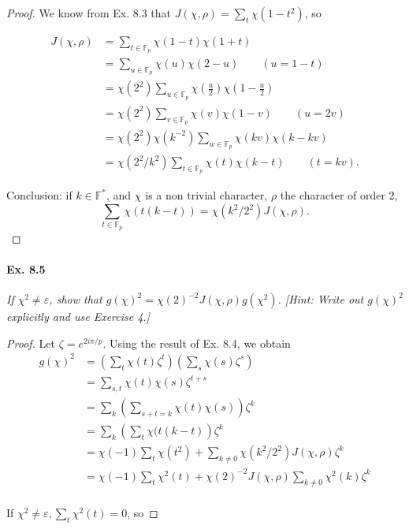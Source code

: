 \documentclass[11pt,a4paper]{article}
\newcommand{\F}{\mathbb{F}}
\begin{document}
{{}

\begin{proof}
We know from Ex. 8.3 that  $J(\chi,\rho) = \sum_t \chi(1-t^2)$, so

\begin{align*}
J(\chi,\rho) &= \sum_{t \in \F_p}\chi(1-t)\chi(1+t)\\
&=\sum_{u \in \F_p} \chi(u) \chi(2-u)\qquad(u = 1-t)\\
&=\chi(2^2) \sum_{u \in \F_p} \chi\left(\frac{u}{2}\right) \chi\left(1-\frac{u}{2}\right)\\
&= \chi(2^2) \sum_{v \in \F_p} \chi(v) \chi(1-v)\qquad(u = 2v)\\
&= \chi(2^2) \chi(k^{-2}) \sum_{w \in \F_p} \chi(kv) \chi(k-kv)\\
&=\chi(2^2/k^2) \sum_{t \in \F_p} \chi(t) \chi(k-t)\qquad(t=kv).
\end{align*}

Conclusion: if $k \in \mathbb{F}^*$, and $\chi$ is a non trivial character, $\rho$ the character of order 2,
$$ \sum_{t\in \F_p}\chi(t(k-t)) = \chi(k^2/2^2) J(\chi,\rho).$$
\end{proof}

\paragraph{Ex. 8.5}

{\it If $\chi^2 \ne \varepsilon$, show that $g(\chi)^2 = \chi(2)^{-2}J(\chi,\rho)g(\chi^2)$. [Hint: Write out $g(\chi)^2$ explicitly and use Exercise 4.]

}

\begin{proof}
Let  $\zeta = e^{2i\pi/p}$.
Using the result of Ex. 8.4, we obtain
\begin{align*}
g(\chi)^2 &= \left(\sum_t \chi(t) \zeta^t \right)\left(\sum_s \chi(s) \zeta^s\right)\\
&=\sum_{s,t} \chi(t)\chi(s) \zeta^{t+s}\\
&=\sum_k\left(\sum_{s+t=k} \chi(t) \chi(s)\right)\zeta^k\\
&=\sum_k\left( \sum_t \chi(t(k-t) \right) \zeta^k\\
&= \chi(-1)\sum_t \chi(t^2) + \sum_{k\neq0} \chi(k^2/2^2) J(\chi,\rho) \zeta^k\\
&= \chi(-1)\sum_t \chi^2(t) + \chi(2)^{-2}  J(\chi,\rho) \sum_{k\neq0} \chi^2(k)  \zeta^k\\
\end{align*}

If $\chi^2 \neq \varepsilon, \sum_t \chi^2(t)=0$, so


\end{proof}}
\end{document}
